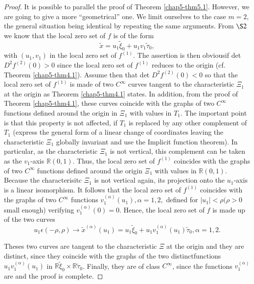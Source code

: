 \begin{proof}
It is possible to parallel the proof of Theorem \ref{chap5-thm5.1}. However, we are going to give a more ``geometrical'' one. We limit ourselves to the case $m = 2$, the general situation being identical by repeating the same arguments. From $\S 2$ we know that the local zero set of $f$ is of the form
$$
\widetilde{x} = u_{1}\widetilde{\xi}_{0} + u_{1}v_{1}\widetilde{\tau}_{0},
$$
with $(u_{1}, v_{1})$ in the local zero set of $f^{(1)}$. The assertion is then obvious\pageoriginale if det $D^{2}f^{(2)}(0) > 0$ since the local zero set of $f^{(1)}$ reduces to the origin (cf. Theorem \ref{chap5-thm4.1}). Assume then that det $D^{2}f^{(2)}(0) < 0$ so that the local zero set of $f^{(1)}$ is made of two $C^{\infty}$ curves tangent to the characteristic $\Xi_{1}$ at the origin as Theorem \ref{chap5-thm4.1} states. In addition, from the proof of Theorem \ref{chap5-thm4.1}, these curves coincide with the graphs of two $C^{\infty}$ functions defined around the origin in $\Xi_{1}$ with values in $T_{1}$. The important point is that this property is not affected, if $T_{1}$ is replaced by any other complement of $T_{1}$ (express the general form of a linear change of coordinates leaving the characteristic $\Xi_{1}$ globally invariant and use the Implicit function theorem). In particular, as the characteristic $\Xi_{1}$ is not vertical, this complement can be taken as the $v_{1}$-axis $\mathbb{R}(0, 1)$. Thus, the local zero set of $f^{(1)}$ coincides with the graphs of two $C^{\infty}$ functions defined around the origin $\Xi_{1}$ with values in $\mathbb{R}(0, 1)$. Because the characterisitc $\Xi_{1}$ is not vertical again, its projection onto the $u_{1}$-axis is a linear isomorphism. It follows that the local zero set of $f^{(1)}$ coincides with the graphs of two $C^{\infty}$ functions $v_{1}^{(\alpha)} (u_{1}), \alpha = 1, 2,$ defined for $|u_{1}| < \rho(\rho > 0$ small enough) verifying $v_{1}^{(\alpha)} (0) = 0$. Hence, the local zero set of $f$ is made up of the two curves
$$
u_{1} \epsilon (-\rho, \rho) \to \widetilde{x}^{(\alpha)} (u_{1}) = u_{1}\widetilde{\xi}_{0} + u_{1}v_{1}^{(\alpha)} (u_{1})\widetilde{\tau}_{0}, \alpha = 1, 2.
$$

Theses two curves are tangent to the characteristic $\Xi$ at the origin and they are distinct, since they coincide with the graphs of the two distinct\pageoriginale functions $u_{1}v_{1}^{(\alpha)} (u_{1})$ in $\mathbb{R} \widetilde{\xi}_{0} \times \mathbb{R}\widetilde{\tau}_{0}$. Finally, they are of class $C^{\infty}$, since the functions $v_{1}^{(\alpha)}$ are and the proof is complete.
\end{proof}


